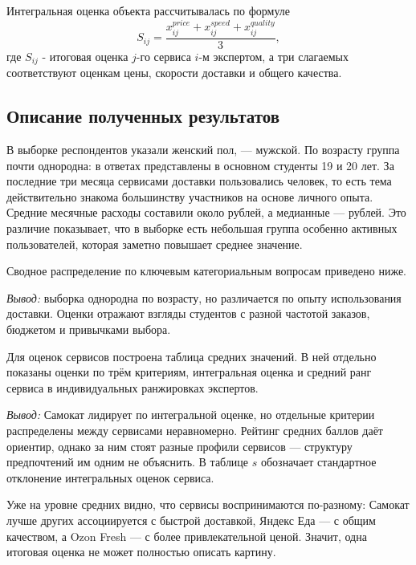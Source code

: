 \documentclass[14pt,a4paper]{extarticle}
\newcommand{\miniresult}[1]{%
    \par\vspace{0.30\baselineskip}%
    \noindent\textit{Вывод:} #1%
    \par\vspace{0.25\baselineskip}%
}
\begin{document}
Интегральная оценка объекта рассчитывалась по формуле
\begin{equation}
S_{ij}=\frac{x_{ij}^{price}+x_{ij}^{speed}+x_{ij}^{quality}}{3},
\end{equation}
где $S_{ij}$ - итоговая оценка $j$-го сервиса $i$-м экспертом, а три слагаемых соответствуют оценкам цены, скорости доставки и общего качества.

\subsection{Описание полученных результатов}

В выборке \FemaleCount{} респондентов указали женский пол, \MaleCount{} — мужской. По возрасту группа почти однородна: в ответах представлены в основном студенты 19 и 20 лет. За последние три месяца сервисами доставки пользовались \UsedThreeMonthsCount{} человек, то есть тема действительно знакома большинству участников на основе личного опыта. Средние месячные расходы составили около \MeanSpend{} рублей, а медианные — \MedianSpend{} рублей. Это различие показывает, что в выборке есть небольшая группа особенно активных пользователей, которая заметно повышает среднее значение.

Сводное распределение по ключевым категориальным вопросам приведено ниже.

\vspace{0.3\baselineskip}

\miniresult{выборка однородна по возрасту, но различается по опыту использования доставки. Оценки отражают взгляды студентов с разной частотой заказов, бюджетом и привычками выбора.}

Для оценок сервисов построена таблица средних значений. В ней отдельно показаны оценки по трём критериям, интегральная оценка и средний ранг сервиса в индивидуальных ранжировках экспертов.

\begin{table}[H]
\centering
\caption{Сводные показатели по оцениваемым сервисам}
\label{tab:service_summary}

\end{table}
\miniresult{Самокат лидирует по интегральной оценке, но отдельные критерии распределены между сервисами неравномерно. Рейтинг средних баллов даёт ориентир, однако за ним стоят разные профили сервисов — структуру предпочтений им одним не объяснить. В таблице $s$ обозначает стандартное отклонение интегральных оценок сервиса.}

Уже на уровне средних видно, что сервисы воспринимаются по-разному: Самокат лучше других ассоциируется с быстрой доставкой, Яндекс Еда — с общим качеством, а Ozon Fresh — с более привлекательной ценой. Значит, одна итоговая оценка не может полностью описать картину.
\end{document}
